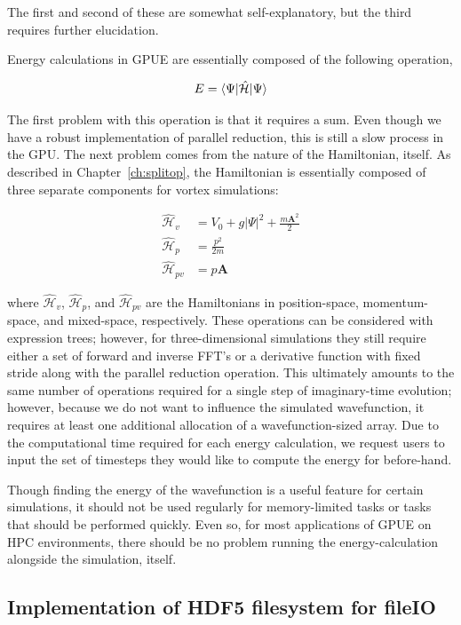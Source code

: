 \noindent The first and second of these are somewhat self-explanatory, but the third requires further elucidation.

Energy calculations in GPUE are essentially composed of the following operation,

\begin{equation}
E = \braket{\Psi|\mathcal{\hat H}|\Psi}
\end{equation}

\noindent The first problem with this operation is that it requires a sum.
Even though we have a robust implementation of parallel reduction, this is still a slow process in the GPU.
The next problem comes from the nature of the Hamiltonian, itself.
As described in Chapter~\ref{ch:splitop}, the Hamiltonian is essentially composed of three separate components for vortex simulations:

\begin{align}
\mathcal{\hat H}_v &= V_0 + g|\Psi|^2 + \frac{m\mathbf{A}^2}{2} \\
\mathcal{\hat H}_p &= \frac{p^2}{2m} \\
\mathcal{\hat H}_{pv} &= p\mathbf{A}
\end{align}

\noindent where $\mathcal{\hat H}_v$, $\mathcal{\hat H}_p$, and $\mathcal{\hat H}_{pv}$ are the Hamiltonians in position-space, momentum-space, and mixed-space, respectively.
These operations can be considered with expression trees; however, for three-dimensional simulations they still require either a set of forward and inverse FFT's or a derivative function with fixed stride along with the parallel reduction operation.
This ultimately amounts to the same number of operations required for a single step of imaginary-time evolution; however, because we do not want to influence the simulated wavefunction, it requires at least one additional allocation of a wavefunction-sized array.
Due to the computational time required for each energy calculation, we request users to input the set of timesteps they would like to compute the energy for before-hand.

Though finding the energy of the wavefunction is a useful feature for certain simulations, it should not be used regularly for memory-limited tasks or tasks that should be performed quickly.
Even so, for most applications of GPUE on HPC environments, there should be no problem running the energy-calculation alongside the simulation, itself.

\subsection{Implementation of HDF5 filesystem for fileIO}

